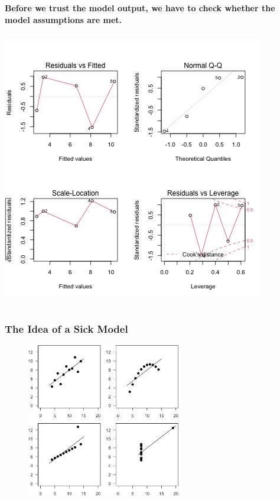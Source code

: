 \documentclass{beamer}
\begin{document}
\begin{frame}
    \frametitle{}
    \textbf{Before we trust the model output, we have to check whether the model assumptions are met.}

    \begin{columns}
        \begin{column}{0.5\textwidth}
        \includegraphics[width=\textwidth]{lectures/day_2_LM_refresh_I/figures/unnamed-chunk-40-1.png}     
        \end{column}
        \begin{column}{0.5\textwidth}
        \scalebox{0.7}{
            
        }     
        \end{column}
    \end{columns}

\end{frame}

\begin{frame}
    \frametitle{The Idea of a Sick Model}
    \begin{figure}
        \centering
        \includegraphics[width=0.6\textwidth]{lectures/day_2_LM_refresh_I/figures/Anscombe.png}
    \end{figure}
\end{frame}
\end{document}
